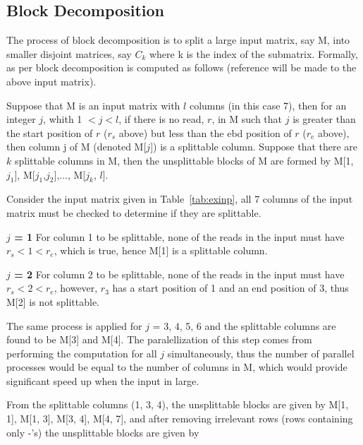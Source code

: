 \documentclass[10pt,twocolumn]{article}
\begin{document}
\subsection{Block Decomposition}

The process of block decomposition is to split a large input matrix, say M, into smaller disjoint matrices,
say $C_k$ where k is the index of the submatrix. Formally, as per \cite{chen:2013} block decomposition is
computed as follows (reference will be made to the above input matrix).

Suppose that M is an input matrix with $l$ columns (in this case 7), then for an integer $j$, whith 1 $< j <
l$, if there is no read, $r$, in M such that $j$ is greater than the start position of $r$ ($r_s$ above) but
less than the ebd position of $r$ ($r_e$ above), then column j of M (denoted M[$j$]) is a splittable column.
Suppose that there are $k$ splittable columns in M, then the unsplittable blocks of M are formed by M[1,
$j_1$], M[$j_1$,$j_2$],..., M[$j_k$, $l$]. 

Consider the input matrix given in Table~\ref{tab:exinp}, all 7 columns of the input matrix must be checked to
determine if they are splittable. 

\textbf{$j$ = 1} For column 1 to be splittable, none of the reads in the input must have $r_s < 1 < r_e$,
which is true, hence M[1] is a splittable column.

\textbf{$j$ = 2} For column 2 to be splittable, none of the reads in the input must have $r_s < 2 < r_e$,
however, $r_3$ has a start position of 1 and an end position of 3, thus M[2] is not splittable.

The same process is applied for $j$ = 3, 4, 5, 6 and the splittable columns are found to be M[3] and M[4]. The
paralellization of this step comes from performing the computation for all $j$ simultaneously, thus the number
of parallel processes would be equal to the number of columns in M, which would provide significant speed up
when the input in large.

From the splittable columns (1, 3, 4), the unsplittable blocks are given by M[1, 1], M[1, 3], M[3, 4], M[4,
7], and after removing irrelevant rows (rows containing only -'s) the unsplittable blocks are given by
\end{document}
